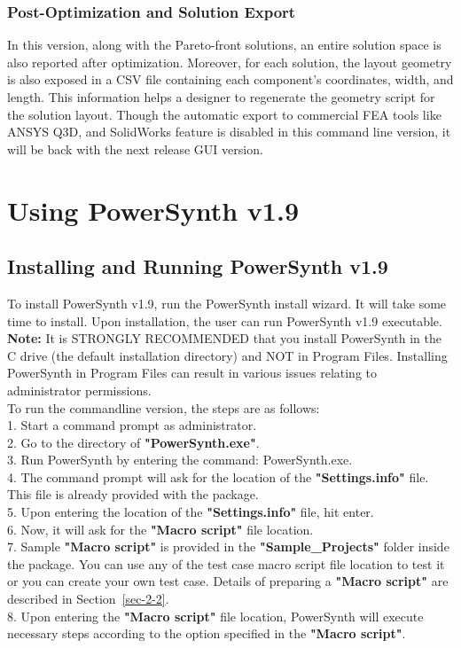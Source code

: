 \documentclass[11pt]{article}
\begin{document}
\subsubsection{Post-Optimization and Solution Export}
In this version, along with the Pareto-front solutions, an entire solution space is also reported after optimization. Moreover, for each solution, the layout geometry is also exposed in a CSV file containing each component's coordinates, width, and length. This information helps a designer to regenerate the geometry script for the solution layout. Though the automatic export to commercial FEA tools like ANSYS Q3D, and SolidWorks feature is disabled in this command line version,
it will be back with the next release GUI version.

\section{Using PowerSynth v1.9}
\label{sec-2}

\subsection{Installing and Running PowerSynth v1.9}
\label{sec-2-1}
To install PowerSynth v1.9, run the PowerSynth install wizard. It will take some time to install. Upon installation, the user can run PowerSynth v1.9 executable.\\
\textbf{Note:} It is STRONGLY RECOMMENDED that you install PowerSynth in the C drive (the default installation directory) and NOT in Program Files. Installing PowerSynth in Program Files can result in various issues relating to administrator permissions.\\
To run the commandline version, the steps are as follows:\\
1. Start a command prompt as administrator.\\
2. Go to the directory of \textbf{"PowerSynth.exe"}.\\
3. Run PowerSynth by entering the command: PowerSynth.exe.\\
4. The command prompt will ask for the location of the \textbf{"Settings.info"} file. This file is already provided with the package.\\
5. Upon entering the location of the \textbf{"Settings.info"} file, hit enter.\\
6. Now, it will ask for the \textbf{"Macro script"} file location.\\
7. Sample \textbf{"Macro script"} is provided in the \textbf{"Sample\_Projects"} folder inside the package. You can use any of the test case macro script file location to test it or you can create your own test case. Details of preparing a \textbf{"Macro script"} are described in Section~\ref{sec-2-2}.\\
8. Upon entering the \textbf{"Macro script"} file location, PowerSynth will execute necessary steps according to the option specified in the \textbf{"Macro script"}.
\end{document}
